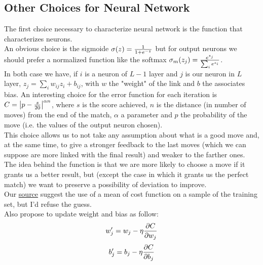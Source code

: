 \documentclass[]{article}
\begin{document}
\subsection{Other Choices for Neural Network}
The first choice necessary to characterize neural network is the function that characterizes neurons. \\
An obvious choice is the sigmoide $\sigma(z)={1 \over {1 + e^{-z}}}$ but for output neurons we should prefer a normalized function like the softmax $\sigma_m (z_j)={{e^{z_j}} \over {\sum_{i} e^{z_i}}}$. \\
In both case we have, if $i$ is a neuron of $L-1$ layer and $j$ is our neuron in $L$ layer, $z_j=\sum_i {w_{ij}}{z_i}+{b_{ij}}$, with $w$ the "weight" of the link and $b$ the associates bias.
An interesting choice for the error function for each iteration is $C={\left| p - {{s} \over 20}\right| }^{\alpha n}$, where $s$ is the score achieved, $n$ is the distance (in number of moves) from the end of the match, $\alpha$ a parameter and $p$ the probability of the move (i.e. the values of the output neuron chosen). \\
This choice allows us to not take any assumption about what is a good move and, at the same time, to give a stronger feedback to the last moves (which we can suppose are more linked with the final result) and weaker to the farther ones. \\
The idea behind the function is that we are more likely to choose a move if it grants us a better result, but (except the case in which it grants us the perfect match) we want to preserve a possibility of deviation to improve. \\
Our \href{http://neuralnetworksanddeeplearning.com}{source} suggest the use of a mean of cost function on a sample of the training set, but I'd refuse the guess. \\
Also propose to update weight and bias as follow:
\[ w'_j = w_j - \eta {{\partial C} \over {\partial w_j}} \]
\[b'_j = b_j - \eta {{\partial C} \over {\partial b_j}}\]
\end{document}
